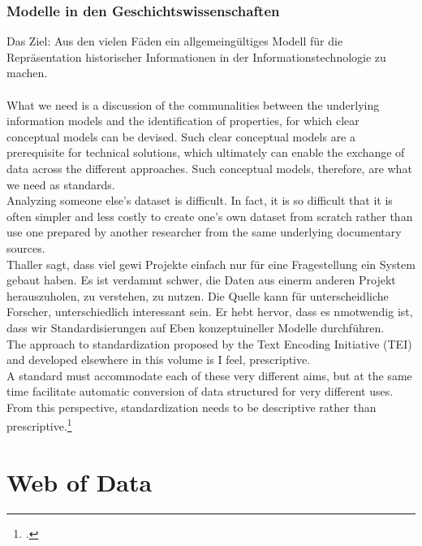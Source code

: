 \documentclass[12pt,a4paper]{article}
\begin{document}
\subsubsection{Modelle in den Geschichtswissenschaften}

Das Ziel: Aus den vielen Fäden ein allgemeingültiges Modell für die Repräsentation historischer Informationen in der Informationstechnologie zu machen.
\\
\\
What we need is a discussion of the communalities between the underlying information models and the identification of properties, for which clear conceptual models can be devised. Such clear conceptual models are a prerequisite for technical solutions, which ultimately can enable the exchange of data across the different approaches. Such conceptual models, therefore, are what we need as standards.
\\
Analyzing someone else’s dataset is difficult. In fact, it is so
difficult that it is often simpler and less costly to create one’s own dataset from
scratch rather than use one prepared by another researcher from the same underlying documentary sources.
\\
Thaller sagt, dass viel gewi Projekte einfach nur für eine Fragestellung ein System gebaut haben. Es ist verdammt schwer, die Daten aus einerm anderen Projekt herauszuholen, zu verstehen, zu nutzen. Die  Quelle kann für unterscheidliche Forscher, unterschiedlich interessant sein. Er hebt hervor, dass es nmotwendig ist, dass wir Standardisierungen auf Eben konzeptuineller Modelle durchführen. 
\\
The approach to
standardization proposed by the Text Encoding Initiative (TEI) and developed
elsewhere in this volume is I feel, prescriptive.
\\
A standard must accommodate each of these very different aims, but at the same time facilitate automatic
conversion of data structured for very different uses. From this perspective, standardization needs to be descriptive rather than prescriptive.\footcite[][S.204]{thaller2017need}

\section{Web of Data}
\end{document}
